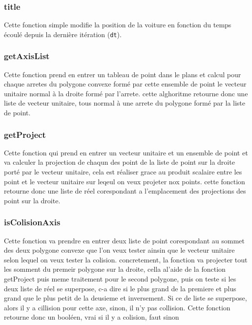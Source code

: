 \documentclass[11pt]{report}
\renewcommand{\tt}[1]{\texttt{#1}}
\begin{document}
\subsubsection{title}



Cette fonction simple modifie la position de la voiture en fonction du temps écoulé depuis la dernière itération (\tt{dt}).


\subsubsection{getAxisList}



Cette fonction prend en entrer un tableau de point dans le plans et calcul pour chaque arretes du polygone convexe formé par cette ensemble de point le vecteur unitaire normal à la droite formé par l'arrete.
cette alghoritme retourne donc une liste de vecteur unitaire, tous normal à une arrete du polygone formé par la liste de point.

\subsubsection{getProject}




Cette fonction qui prend en entrer un vecteur unitaire et un ensemble de point et va calculer la projection de chaqun des point de la liste de point sur la droite porté par le vecteur unitaire, cela est réaliser grace au produit scalaire entre les point et le vecteur unitaire sur leqeul on veux projeter nox points. cette fonction retourne donc une liste de réel corespondant a l'emplacement des projections des point sur la droite.


\subsubsection{isColisionAxis}



Cette fonction va prendre en entrer deux liste de point corespondant au sommet des deux polygone convexe que l'on veux tester ainsin que le vecteur unitaire selon lequel on veux tester la colision. concretement, la fonction va projecter tout les somment du premeir polygone sur la droite, cella al'aide de la fonction getProject puis meme traitement pour le second polygone, puis on teste si les deux liste de réel se superpose, c-a dire si le plus grand de la premiere et plus grand que le plus petit de la deusieme et inversement.
Si ce de liste se superpose, alors il y a cillision pour cette axe, sinon, il n'y pas collision.
Cette fonction retourne donc un booléen, vrai si il y a colision, faut sinon
\end{document}

